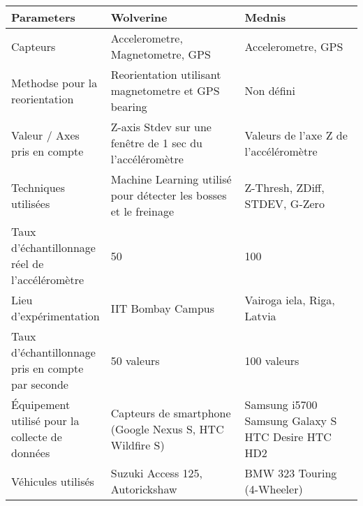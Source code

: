 
\begin{table}[]
    \centering
    \begin{tabular}{|m{0.25\linewidth}|m{0.4\linewidth}|m{0.35\linewidth}|}
        \hline
        Parameters                                         & Wolverine                                                        & Mednis                                                   \\
        \hline
        Capteurs                                           & Accelerometre, Magnetometre, GPS                                 & Accelerometre, GPS                                       \\
        \hline
        Methodse pour la reorientation                     & Reorientation utilisant magnetometre et GPS bearing              & Non défini                                               \\
        \hline
        Valeur / Axes pris en compte                       & Z-axis Stdev sur une fenêtre de 1 sec du l'accéléromètre         & Valeurs de l'axe Z de l'accéléromètre                    \\
        \hline
        Techniques utilisées                               & Machine Learning utilisé pour détecter les bosses et le freinage & Z-Thresh, ZDiff, STDEV, G-Zero                           \\
        \hline
        Taux d'échantillonnage réel de l'accéléromètre     & 50                                                               & 100                                                      \\
        \hline
        Lieu d'expérimentation                             & IIT Bombay Campus                                                & Vairoga iela, Riga, Latvia                               \\
        \hline
        Taux d'échantillonnage pris en compte par seconde  & 50 valeurs                                                        & 100 valeurs                                               \\
        \hline
        Équipement utilisé pour la collecte de données     & Capteurs de smartphone (Google Nexus S, HTC Wildfire S)          & Samsung i5700 Samsung Galaxy S HTC Desire HTC HD2        \\
        \hline
        Véhicules utilisés                                 & Suzuki Access 125, Autorickshaw                                  & BMW 323 Touring (4-Wheeler)                              \\

\end{tabular}
\end{table}
